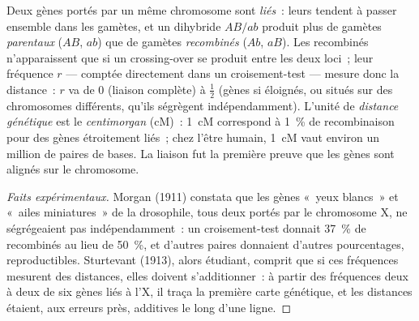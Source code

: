 \begin{definition}\label{def:b2:meiosis-heredity:linkage}
Deux gènes portés par un même chromosome sont \emph{liés}~: leurs
 tendent à passer ensemble dans les gamètes, et un dihybride
$AB/ab$ produit plus de gamètes \emph{parentaux} ($AB$, $ab$) que de
gamètes \emph{recombinés} ($Ab$, $aB$). Les recombinés n'apparaissent
que si un crossing-over se produit entre les deux loci~; leur fréquence
$r$ --- comptée directement dans un croisement-test --- mesure donc la
distance~: $r$ va de 0 (liaison complète) à $\tfrac12$ (gènes si
éloignés, ou situés sur des chromosomes différents, qu'ils ségrègent
indépendamment). L'unité de \emph{distance génétique} est le
\emph{centimorgan} (cM)~: \qty{1}{cM}
correspond à \qty{1}{\%} de recombinaison pour des gènes étroitement
liés~; chez l'être humain, \qty{1}{cM} vaut environ un million de paires
de bases. La liaison fut la première preuve que les gènes sont alignés
sur le chromosome.
\end{definition}
\begin{proof}[Faits expérimentaux]
Morgan (1911) constata que les gènes «~yeux blancs~» et «~ailes
miniatures~» de la drosophile, tous deux portés
par le chromosome X, ne ségrégeaient pas indépendamment~: un
croisement-test donnait \qty{37}{\%} de recombinés au lieu de
\qty{50}{\%}, et d'autres paires donnaient d'autres pourcentages,
reproductibles. Sturtevant (1913), alors étudiant, comprit que si ces
fréquences mesurent des distances, elles doivent s'additionner~: à
partir des fréquences deux à deux de six gènes liés à l'X, il traça la
première carte génétique, et les distances étaient, aux erreurs près,
additives le long d'une ligne.
\end{proof}

